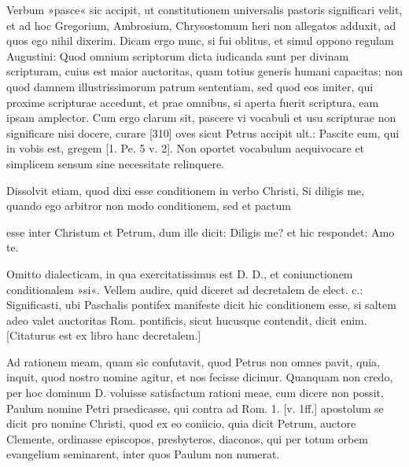 Verbum »pasce« sic accipit, ut constitutionem universalis pastoris significari velit, et ad hoc Gregorium, Ambrosium, Chrysostomum heri non allegatos adduxit, ad quos ego nihil dixerim. Dicam ergo nunc, si fui oblitus, et simul oppono regulam Augustini: Quod omnium scriptorum dicta iudicanda sunt per divinam scripturam, cuius est maior auctoritas, quam totius generis humani capacitas; non quod damnem illustrissimorum patrum sententiam, sed quod eos imiter, qui proxime scripturae accedunt, et prae omnibus, si aperta fuerit scriptura, eam ipsam amplector. Cum ergo clarum sit, pascere vi vocabuli et usu scripturae non significare nisi docere, curare [310] oves sicut Petrus accipit ult.: Pascite eum, qui in vobis est, gregem [1. Pe. 5 v. 2]. Non oportet vocabulum aequivocare et simplicem sensum sine necessitate relinquere.

Dissolvit etiam, quod dixi esse conditionem in verbo Christi, Si diligis me, quando ego arbitror non modo conditionem, sed et pactum

esse inter Christum et Petrum, dum ille dicit: Diligis me? et hic respondet: Amo te.

Omitto dialecticam, in qua exercitatissimus est D. D., et coniunctionem conditionalem »si«. Vellem audire, quid diceret ad decretalem de elect. c.: Significasti, ubi Paschalis pontifex manifeste dicit hic conditionem esse, si saltem adeo valet auctoritas Rom. pontificis, sicut hucusque contendit, dicit enim. [Citaturus est ex libro hanc decretalem.]

Ad rationem meam, quam sic confutavit, quod Petrus non omnes pavit, quia, inquit, quod nostro nomine agitur, et nos fecisse dicimur. Quanquam non credo, per hoc dominum D. voluisse satisfactum rationi meae, cum dicere non possit, Paulum nomine Petri praedicasse, qui contra ad Rom. 1. [v. 1ff.] apostolum se dicit pro nomine Christi, quod ex eo coniicio, quia dicit Petrum, auctore Clemente, ordinasse episcopos, presbyteros, diaconos, qui per totum orbem evangelium seminarent, inter quos Paulum non numerat.

